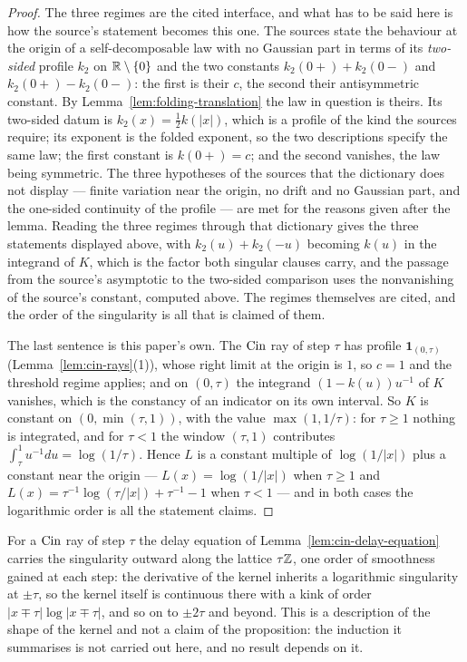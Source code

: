 \begin{proof}
The three regimes are the cited interface, and what has to be said here is how the source's
statement becomes this one. The sources state the behaviour at the origin of a self-decomposable
law with no Gaussian part in terms of its \emph{two-sided} profile $k_2$ on $\mathbb{R} \setminus \{0\}$
and the two constants $k_2(0{+}) + k_2(0{-})$ and $k_2(0{+}) - k_2(0{-})$: the first is their
$c$, the second their antisymmetric constant. By Lemma~\ref{lem:folding-translation} the law in
question is theirs. Its two-sided datum is $k_2(x) = \tfrac12 k(|x|)$, which is a profile of the
kind the sources require; its exponent is the folded exponent, so the two descriptions specify
the same law; the first constant is $k(0{+}) = c$; and the second vanishes, the law being
symmetric. The three hypotheses of the sources that the dictionary does not display --- finite
variation near the origin, no drift and no Gaussian part, and the one-sided continuity of the
profile --- are met for the reasons given after the lemma. Reading the three regimes through that
dictionary gives the three statements
displayed above, with $k_2(u) + k_2(-u)$ becoming $k(u)$ in the integrand of $K$, which is the
factor both singular clauses carry, and the passage from the source's asymptotic to the two-sided
comparison uses the nonvanishing of the source's constant, computed above. The regimes themselves
are cited, and the order of the singularity is all that is claimed of them.

The last sentence is this paper's own. The $\operatorname{Cin}$ ray of step $\tau$ has profile
$\mathbf 1_{(0,\tau)}$ (Lemma~\ref{lem:cin-rays}(1)), whose right limit at the origin is $1$, so
$c = 1$ and the threshold regime applies; and on $(0,\tau)$ the integrand $(1 - k(u))u^{-1}$ of
$K$ vanishes, which is the constancy of an indicator on its own interval. So $K$ is constant on $(0,\min(\tau,1))$, with the value
$\max(1,1/\tau)$: for $\tau \ge 1$ nothing is integrated, and for $\tau < 1$ the window $(\tau,1)$
contributes $\int_\tau^1 u^{-1}du = \log(1/\tau)$. Hence $L$ is a constant multiple of
$\log(1/|x|)$ plus a constant near the origin --- $L(x) = \log(1/|x|)$ when $\tau \ge 1$ and
$L(x) = \tau^{-1}\log(\tau/|x|) + \tau^{-1} - 1$ when $\tau < 1$ --- and in both cases the
logarithmic order is all the statement claims.
\end{proof}

\begin{remark}\label{rem:cin-propagation}
For a $\operatorname{Cin}$ ray of step $\tau$ the delay equation of Lemma~\ref{lem:cin-delay-equation}
carries the singularity outward along the lattice $\tau\mathbb{Z}$, one order of smoothness gained at
each step: the derivative of the kernel inherits a logarithmic singularity at $\pm\tau$, so the
kernel itself is continuous there with a kink of order $|x \mp \tau|\log|x \mp \tau|$, and so
on to $\pm2\tau$ and beyond. This is a description of the shape of the kernel and not a claim
of the proposition: the induction it summarises is not carried out here, and no result depends
on it.
\end{remark}

